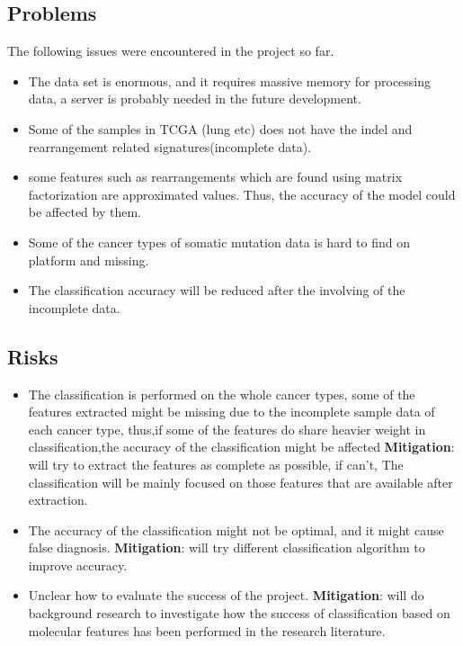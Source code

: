 \documentclass[11pt]{article}
\begin{document}
\subsection{Problems}\label{problems}

The following issues were encountered in the project so far.
\begin{itemize}

\item The data set is enormous, and it requires massive memory for processing data, a server is probably needed in the future development.
\item Some of the samples in TCGA (lung etc) does not have the indel and rearrangement related signatures(incomplete data).
\item some features such as rearrangements which are found using matrix factorization are approximated values. Thus, the accuracy of the model could be affected by them.
\item Some of the cancer types of somatic mutation data is hard to find on platform and missing.
\item The classification accuracy will be reduced after the involving of the incomplete data.

\end{itemize}

\subsection{Risks}\label{risks}

\begin{itemize}
\item The classification is performed on the whole cancer types, some of the features extracted might be missing due to the incomplete sample data of each cancer type, thus,if some of the features do share heavier weight in classification,the accuracy of the classification might be affected \textbf{Mitigation}: will try to extract the features as complete as possible, if can't, The classification will be mainly focused on those features that are available after extraction.
\item The accuracy of the classification might not be optimal, and it might cause false diagnosis. \textbf{Mitigation}: will try different classification algorithm to improve accuracy.
\item Unclear how to evaluate the success of the project. \textbf{Mitigation}: will do
background research to investigate how the success of classification based on molecular features has
been performed in the research literature.
\end{itemize}
\end{document}
